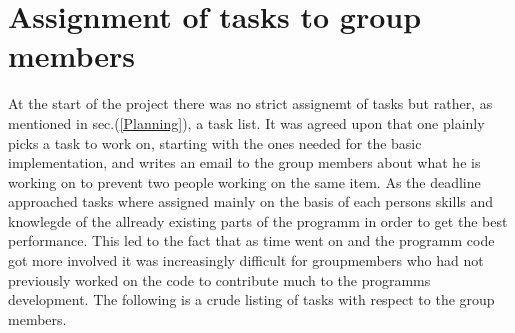\section{Assignment of tasks to group members}
\label{Assignment of tasks to group members}

At the start of the project there was no strict assignemt of tasks but rather, as mentioned in sec.(\ref{Planning}), a task list. It was agreed upon that one plainly picks a task to work on, starting with the ones needed for the basic implementation, and writes an email to the group members about what he is working on to prevent two people working on the same item.
As the deadline approached tasks where assigned mainly on the basis of each persons skills and knowlegde of the allready existing parts of the programm in order to get the best performance. This led to the fact that as time went on and the programm code got more involved it was increasingly difficult for groupmembers who had not previously worked on the code to contribute much to the programms development.
The following is a crude listing of tasks with respect to the group members.

